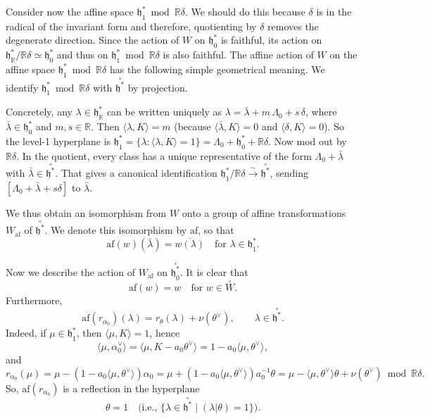 \documentclass[12pt]{article}
\begin{document}
Consider now the affine space $\mathfrak{h}^*_1 \bmod \mathbb{R}\delta$. We should do this because $\delta$ is in the radical of the invariant form and therefore, quotienting by $\delta$ removes the degenerate direction. Since the action of $W$ on $\mathfrak{h}^*_0$ is faithful, its action on $\mathfrak{h}^*_\mathbb{R}/\mathbb{R}\delta \simeq \mathfrak{h}^*_0$ and thus on $\mathfrak{h}^*_1 \bmod \mathbb{R}\delta$ is also faithful. The affine action of $W$ on the affine space $\mathfrak{h}^*_1 \bmod \mathbb{R}\delta$ has the following simple geometrical meaning. We identify $\mathfrak{h}^*_1 \bmod \mathbb{R}\delta$ with $\overset{\circ}{\mathfrak{h}^*}$ by projection.

Concretely, any $\lambda\in\mathfrak{h}^*_\mathbb{R}$ can be written uniquely as $\lambda = \bar{\lambda} + m\,\Lambda_0 + s\,\delta$, where $\bar{\lambda}\in\mathfrak{h}^*_0$ and $m,s\in\mathbb{R}$. Then $\langle\lambda,K\rangle = m$ (because $\langle\bar\lambda,K\rangle=0$ and $\langle\delta,K\rangle=0$). So the level-1 hyperplane is $\mathfrak{h}^*_1=\{\lambda:\langle\lambda,K\rangle=1\} = \Lambda_0 + \mathfrak{h}^*_0 + \mathbb{R}\delta$.  Now mod out by $\mathbb{R}\delta$. In the quotient, every class has a unique representative of the form $\Lambda_0+\bar{\lambda}$ with $\bar{\lambda}\in\overset{\circ}{\mathfrak{h}^*}$. That gives a canonical identification
$\mathfrak{h}^*_1/\mathbb{R}\delta \xrightarrow{\sim} \overset{\circ}{\mathfrak{h}^*}$, sending $[\Lambda_0+\bar{\lambda}+s\delta]$ to $\bar{\lambda}$.


We thus obtain an isomorphism from $W$ onto a group of affine transformations $W_{\mathrm{af}}$ of $\overset{\circ}{\mathfrak{h}^*}$. We denote this isomorphism by $\mathrm{af}$, so that
\[
    \mathrm{af}(w)(\bar\lambda) = \overline{w(\lambda)} \quad \text{for } \lambda \in \mathfrak{h}^*_1.
\]

Now we describe the action of $W_{\mathrm{af}}$ on $\overset{\circ}{\mathfrak{h}^*_0}$. It is clear that
\begin{equation} \label{6.6.1}
    \mathrm{af}(w) = w \quad \text{for } w \in \overset{\circ}{W}.
\end{equation}
Furthermore,
\begin{equation} \label{6.6.2}
    \mathrm{af}(r_{\alpha_0})(\lambda) = r_\theta(\lambda) + \nu(\theta^\vee), 
    \qquad \lambda \in \overset{\circ}{\mathfrak{h}^*}.
\end{equation}
Indeed, if $\mu \in \mathfrak{h}^*_1$, then $\langle \mu,K\rangle = 1$, hence
\[
    \langle \mu,\alpha_0^\vee\rangle = \langle \mu, K - a_0\theta^\vee\rangle 
    = 1 - a_0\langle \mu,\theta^\vee\rangle,
\]
and 
\[
    r_{\alpha_0}(\mu) = \mu - (1 - a_0\langle \mu,\theta^\vee\rangle)\alpha_0
    = \mu + (1 - a_0\langle \mu,\theta^\vee\rangle)a_0^{-1}\theta
    = \mu - \langle \mu,\theta^\vee\rangle\theta + \nu(\theta^\vee) \bmod \mathbb{R}\delta.
\]
So, $\mathrm{af}(r_{\alpha_0})$ is a reflection in the hyperplane
\[
    \theta = 1 \quad \text{(i.e., } \{\lambda \in \overset{\circ}{\mathfrak{h}^*} \mid (\lambda|\theta)=1\}).
\]
\end{document}
